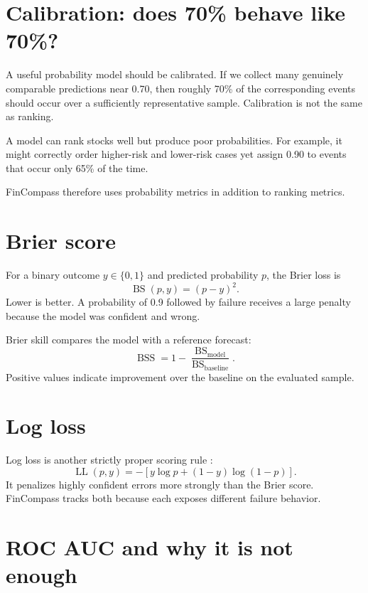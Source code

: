 \documentclass[11pt]{article}
\begin{document}
\section{Calibration: does 70\% behave like 70\%?}

A useful probability model should be calibrated. If we collect many genuinely comparable predictions near 0.70, then roughly 70\% of the corresponding events should occur over a sufficiently representative sample. Calibration is not the same as ranking.

A model can rank stocks well but produce poor probabilities. For example, it might correctly order higher-risk and lower-risk cases yet assign 0.90 to events that occur only 65\% of the time.

FinCompass therefore uses probability metrics in addition to ranking metrics.

\section{Brier score}

For a binary outcome $y\in\{0,1\}$ and predicted probability $p$, the Brier loss is \citep{brier1950verification}
\begin{equation}
\operatorname{BS}(p,y)=(p-y)^2.
\end{equation}
Lower is better. A probability of 0.9 followed by failure receives a large penalty because the model was confident and wrong.

Brier skill compares the model with a reference forecast:
\begin{equation}
\operatorname{BSS}=1-\frac{\operatorname{BS}_{\text{model}}}{\operatorname{BS}_{\text{baseline}}}.
\end{equation}
Positive values indicate improvement over the baseline on the evaluated sample.

\section{Log loss}

Log loss is another strictly proper scoring rule \citep{gneiting2007proper}:
\begin{equation}
\operatorname{LL}(p,y)=-\left[y\log p+(1-y)\log(1-p)\right].
\end{equation}
It penalizes highly confident errors more strongly than the Brier score. FinCompass tracks both because each exposes different failure behavior.

\section{ROC AUC and why it is not enough}
\end{document}
